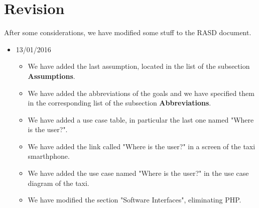 \section{Revision}
After some considerations, we have modified some stuff to the RASD document.
\begin{itemize}
	\item 13/01/2016
\begin{itemize}
    \item We have added the last assumption, located in the list of the subsection \textbf{Assumptions}.
    \item We have added the abbreviations of the goals and we have specified them in the corresponding list of the subsection \textbf{Abbreviations}.
    \item We have added a use case table, in particular the last one named "Where is the user?".
    \item We have added the link called "Where is the user?" in a screen of the taxi smarthphone.
    \item We have added the use case named "Where is the user?" in the use case diagram of the taxi.
    \item We have modified the section "Software Interfaces", eliminating PHP.
\end{itemize}
\end{itemize}